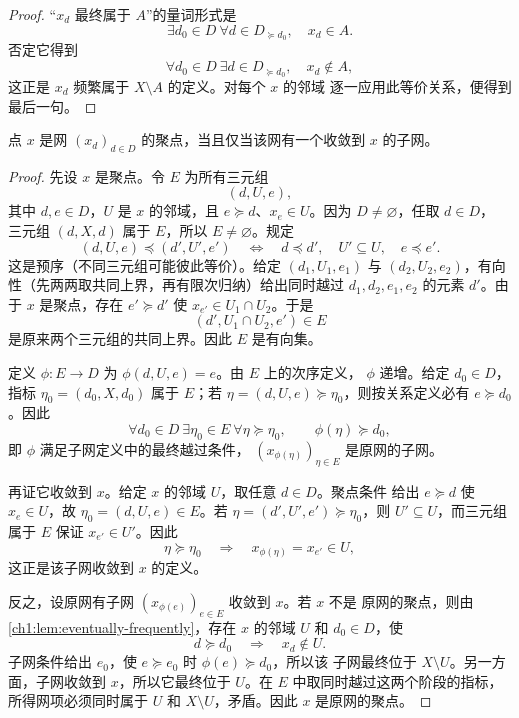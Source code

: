 \begin{proof}
“\(x_d\) 最终属于 \(A\)”的量词形式是
\[
 \exists d_0\in D\ \forall d\in D_{\succeq d_0},\quad x_d\in A.
\]
否定它得到
\[
 \forall d_0\in D\ \exists d\in D_{\succeq d_0},\quad x_d\notin A,
\]
这正是 \(x_d\) 频繁属于 \(X\setminus A\) 的定义。对每个 \(x\) 的邻域
逐一应用此等价关系，便得到最后一句。
\end{proof}

\begin{theorem}[聚点与收敛子网]
点 \(x\) 是网 \((x_d)_{d\in D}\) 的聚点，当且仅当该网有一个收敛到 \(x\)
的子网。
\label{ch1:thm:cluster-subnet}
\end{theorem}


\begin{proof}
先设 \(x\) 是聚点。令 \(E\) 为所有三元组
\[
 (d,U,e),
\]
其中 \(d,e\in D\)，\(U\) 是 \(x\) 的邻域，且
\(e\succeq d\)、\(x_e\in U\)。因为 \(D\neq\varnothing\)，任取 \(d\in D\)，
三元组 \((d,X,d)\) 属于 \(E\)，所以 \(E\neq\varnothing\)。规定
\[
 (d,U,e)\preceq(d',U',e')
 \quad\Longleftrightarrow\quad
 d\preceq d',\quad U'\subseteq U,\quad e\preceq e'.
\]
这是预序（不同三元组可能彼此等价）。给定 \((d_1,U_1,e_1)\) 与
\((d_2,U_2,e_2)\)，有向性（先两两取共同上界，再有限次归纳）给出同时越过
\(d_1,d_2,e_1,e_2\) 的元素 \(d'\)。由于 \(x\) 是聚点，存在 \(e'\succeq d'\) 使
\(x_{e'}\in U_1\cap U_2\)。于是
\[
 (d',U_1\cap U_2,e')\in E
\]
是原来两个三元组的共同上界。因此 \(E\) 是有向集。

定义 \(\phi\colon E\to D\) 为 \(\phi(d,U,e)=e\)。由 \(E\) 上的次序定义，
\(\phi\) 递增。给定 \(d_0\in D\)，指标 \(\eta_0=(d_0,X,d_0)\) 属于
\(E\)；若 \(\eta=(d,U,e)\succeq\eta_0\)，则按关系定义必有
\(e\succeq d_0\)。因此
\[
 \forall d_0\in D\ \exists\eta_0\in E\ \forall\eta\succeq\eta_0,\qquad
 \phi(\eta)\succeq d_0,
\]
即 \(\phi\) 满足子网定义中的最终越过条件，
\((x_{\phi(\eta)})_{\eta\in E}\) 是原网的子网。

再证它收敛到 \(x\)。给定 \(x\) 的邻域 \(U\)，取任意 \(d\in D\)。聚点条件
给出 \(e\succeq d\) 使 \(x_e\in U\)，故 \(\eta_0=(d,U,e)\in E\)。若
\(\eta=(d',U',e')\succeq\eta_0\)，则 \(U'\subseteq U\)，而三元组属于 \(E\)
保证 \(x_{e'}\in U'\)。因此
\[
 \eta\succeq\eta_0\quad\Longrightarrow\quad
 x_{\phi(\eta)}=x_{e'}\in U,
\]
这正是该子网收敛到 \(x\) 的定义。

反之，设原网有子网 \((x_{\phi(e)})_{e\in E}\) 收敛到 \(x\)。若 \(x\) 不是
原网的聚点，则由 \cref{ch1:lem:eventually-frequently}，存在 \(x\) 的邻域 \(U\)
和 \(d_0\in D\)，使
\[
 d\succeq d_0\quad\Longrightarrow\quad x_d\notin U.
\]
子网条件给出 \(e_0\)，使 \(e\succeq e_0\) 时 \(\phi(e)\succeq d_0\)，所以该
子网最终位于 \(X\setminus U\)。另一方面，子网收敛到 \(x\)，所以它最终位于
\(U\)。在 \(E\) 中取同时越过这两个阶段的指标，所得网项必须同时属于 \(U\)
和 \(X\setminus U\)，矛盾。因此 \(x\) 是原网的聚点。
\end{proof}

